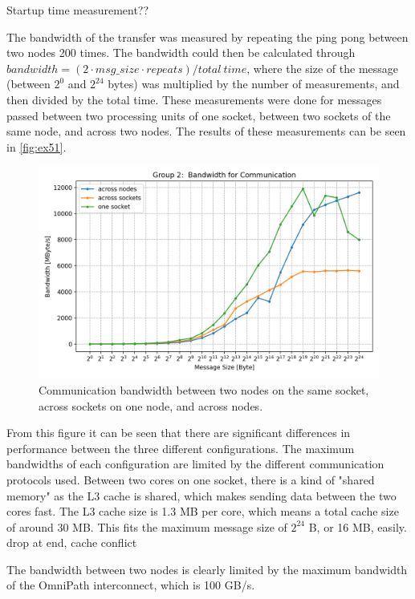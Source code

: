 Startup time measurement??

The bandwidth of the transfer was measured by repeating the ping pong between two nodes 200 times. The bandwidth could then be calculated through \(bandwidth = (2 \cdot msg\_size \cdot repeats) / total\ time\), where the size of the message (between $2^0$ and $2^{24}$ bytes) was multiplied by the number of measurements, and then divided by the total time. These measurements were done for messages passed between two processing units of one socket, between two sockets of the same node, and across two nodes. The results of these measurements can be seen in \autoref{fig:ex51}. 

\begin{figure}[h]
    \centering
    \includegraphics[width=1.0\linewidth]{figures/ex5.png}
    \caption{Communication bandwidth between two nodes on the same socket, across sockets on one node, and across nodes.}
    \label{fig:ex51}
\end{figure}

From this figure it can be seen that there are significant differences in performance between the three different configurations. The maximum bandwidths of each configuration are limited by the different communication protocols used. Between two cores on one socket, there is a kind of "shared memory" as the L3 cache is shared, which makes sending data between the two cores fast. The L3 cache size is 1.3 MB per core, which means a total cache size of around 30 MB. This fits the maximum message size of $2^{24}$ B, or 16 MB, easily. drop at end, cache conflict

The bandwidth between two nodes is clearly limited by the maximum bandwidth of the OmniPath interconnect, which is 100 GB/s.

